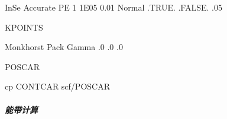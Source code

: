 \documentclass[a4paper,12pt,english]{sphinxmanual}
\begin{document}
\begin{sphinxVerbatim}[commandchars=\\\{\}]
  InSe
  
  
    Accurate
   
     PE
     
    
    
  \PYGZhy{}1
    
   1E\PYGZhy{}05
  \PYGZhy{}0.01
    Normal
   .TRUE.
   .FALSE.
  
   .05
  
    
\end{sphinxVerbatim}

\begin{DUlineblock}{0em}
\item[] KPOINTS
\end{DUlineblock}

\begin{sphinxVerbatim}[commandchars=\\\{\}]
Monkhorst Pack
Gamma
       
.0   .0   .0
\end{sphinxVerbatim}

\begin{DUlineblock}{0em}
\item[] POSCAR
\end{DUlineblock}

\begin{sphinxVerbatim}[commandchars=\\\{\}]
cp CONTCAR scf/POSCAR
\end{sphinxVerbatim}


\subparagraph{能带计算}
\label{\detokenize{tutorials/vasp/mobility:id8}}
\end{document}
